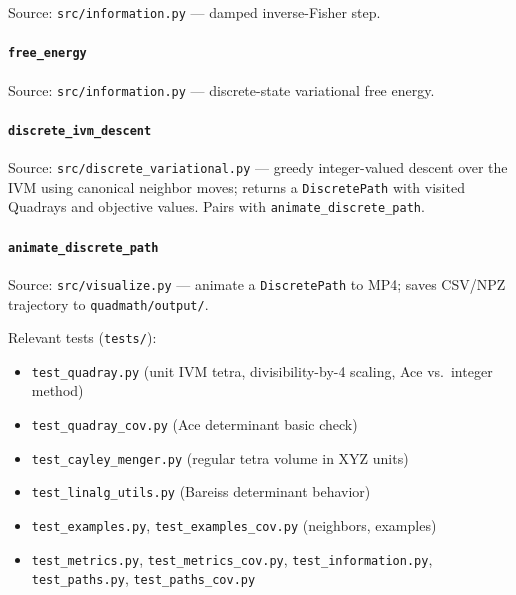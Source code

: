 \documentclass[
  10pt,
]{article}
\providecommand{\tightlist}{%
  \setlength{\itemsep}{0pt}\setlength{\parskip}{0pt}}
\begin{document}
Source: \texttt{src/information.py} --- damped inverse-Fisher step.

\hypertarget{code:free_energy}{%
\paragraph{\texorpdfstring{\texttt{free\_energy}}{free\_energy}}\label{code:free_energy}}

Source: \texttt{src/information.py} --- discrete-state variational free
energy.

\hypertarget{code:discrete_ivm_descent}{%
\paragraph{\texorpdfstring{\texttt{discrete\_ivm\_descent}}{discrete\_ivm\_descent}}\label{code:discrete_ivm_descent}}

Source: \texttt{src/discrete\_variational.py} --- greedy integer-valued
descent over the IVM using canonical neighbor moves; returns a
\texttt{DiscretePath} with visited Quadrays and objective values. Pairs
with \texttt{animate\_discrete\_path}.

\hypertarget{code:animate_discrete_path}{%
\paragraph{\texorpdfstring{\texttt{animate\_discrete\_path}}{animate\_discrete\_path}}\label{code:animate_discrete_path}}

Source: \texttt{src/visualize.py} --- animate a \texttt{DiscretePath} to
MP4; saves CSV/NPZ trajectory to \texttt{quadmath/output/}.

Relevant tests (\texttt{tests/}):

\begin{itemize}
\tightlist
\item
  \texttt{test\_quadray.py} (unit IVM tetra, divisibility-by-4 scaling,
  Ace vs.~integer method)
\item
  \texttt{test\_quadray\_cov.py} (Ace determinant basic check)
\item
  \texttt{test\_cayley\_menger.py} (regular tetra volume in XYZ units)
\item
  \texttt{test\_linalg\_utils.py} (Bareiss determinant behavior)
\item
  \texttt{test\_examples.py}, \texttt{test\_examples\_cov.py}
  (neighbors, examples)
\item
  \texttt{test\_metrics.py}, \texttt{test\_metrics\_cov.py},
  \texttt{test\_information.py}, \texttt{test\_paths.py},
  \texttt{test\_paths\_cov.py}
\end{itemize}
\end{document}
